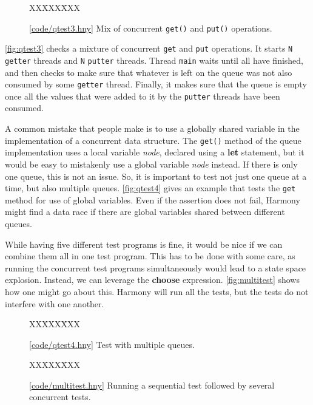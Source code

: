 \documentclass{report}
\newcommand{\harmonysource}[1]{
\begin{tabbing}
XX\=XXX\=XXX\kill
    
\end{tabbing}
}
\newcommand{\harmonylink}[1]{%
[\href{https://harmony.cs.cornell.edu/#1}{\underline{#1}}]%
}
\newenvironment{code}{
\tcolorbox
}{
\endtcolorbox
}
\begin{document}
\begin{figure}
\begin{code}
\harmonysource{qtest3}
\end{code}
\caption{\harmonylink{code/qtest3.hny} Mix of concurrent
\texttt{get()} and \texttt{put()} operations.}
\label{fig:qtest3}
\end{figure}

\autoref{fig:qtest3} checks a mixture of
concurrent \texttt{get} and \texttt{put} operations.
It starts \texttt{N} \texttt{getter} threads and
\texttt{N} \texttt{putter} threads.
Thread \texttt{main} waits until all have finished,
and then checks to make sure that whatever is left
on the queue was not also consumed by some
\texttt{getter} thread.
Finally, it makes sure that the queue is empty
once all the values that were added
to it by the \texttt{putter} threads have been consumed.

A common mistake that people make is to use
a globally shared variable in the implementation of
a concurrent data structure.
The \texttt{get()} method of the queue implementation
uses a local variable \textit{node}, declared using
a \textbf{let} statement, but it would be easy to
mistakenly use a global variable \textit{node} instead.
If there is only one queue, this is not an issue.
So, it is important to test not just one queue at a
time, but also multiple queues.
\autoref{fig:qtest4} gives an example that
tests the \texttt{get} method for use of global
variables.  Even if the assertion does not fail,
Harmony might find a data race if there are global
variables shared between different queues.

While having five different test programs is fine,
it would be nice if we can combine them all in one
test program.
This has to be done with some care, as running the
concurrent test programs simultaneously would
lead to a state space explosion.
Instead, we can leverage the \textbf{choose}
expression.
\autoref{fig:multitest} shows how one might go
about this.
Harmony will run all the tests, but the
tests do not interfere with one another.

\begin{figure}
\begin{code}
\harmonysource{qtest4}
\end{code}
\caption{\harmonylink{code/qtest4.hny} Test with multiple queues.}
\label{fig:qtest4}
\end{figure}

\begin{figure}
\begin{code}
\harmonysource{multitest}
\end{code}
\caption{\harmonylink{code/multitest.hny} Running a
sequential test followed by several concurrent tests.}
\label{fig:multitest}
\end{figure}
\end{document}

